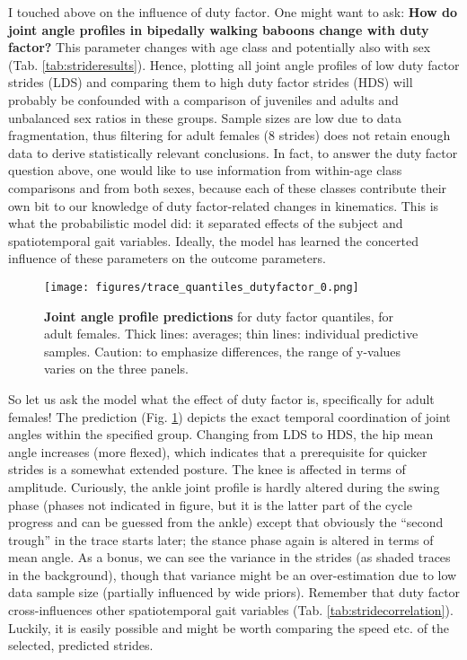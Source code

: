 I touched above on the influence of duty factor.
One might want to ask:
\textbf{How do joint angle profiles in bipedally walking baboons change with duty factor?}
This parameter changes with age class and potentially also with sex (Tab. \ref{tab:strideresults}).
Hence, plotting all joint angle profiles of low duty factor strides (LDS) and comparing them to high duty factor strides (HDS) will probably be confounded with a comparison of juveniles and adults and unbalanced sex ratios in these groups.
Sample sizes are low due to data fragmentation, thus filtering for adult females (8 strides) does not retain enough data to derive statistically relevant conclusions.
In fact, to answer the duty factor question above, one would like to use information from within-age class comparisons and from both sexes, because each of these classes contribute their own bit to our knowledge of duty factor-related changes in kinematics.
This is what the probabilistic model did: it separated effects of the subject and spatiotemporal gait variables.
Ideally, the model has learned the concerted influence of these parameters on the outcome parameters.


\begin{figure}[p]
\centering
\texttt{[image: figures/trace\_quantiles\_dutyfactor\_0.png]}
\caption{\label{fig:dutyquantileprediction}\textbf{Joint angle profile predictions} for duty factor quantiles, for adult females. Thick lines: averages; thin lines: individual predictive samples. Caution: to emphasize differences, the range of y-values varies on the three panels.}
\end{figure}

So let us ask the model what the effect of duty factor is, specifically for adult females!
The prediction (Fig. \ref{fig:dutyquantileprediction}) depicts the exact temporal coordination of joint angles within the specified group.
Changing from LDS to HDS, the hip mean angle increases (more flexed), which indicates that a prerequisite for quicker strides is a somewhat extended posture.
The knee is affected in terms of amplitude.
Curiously, the ankle joint profile is hardly altered during the swing phase (phases not indicated in figure, but it is the latter part of the cycle progress and can be guessed from the ankle) except that obviously the ``second trough'' in the trace starts later; the stance phase again is altered in terms of mean  angle.
As a bonus, we can see the variance in the strides (as shaded traces in the background), though that variance might be an over-estimation due to low data sample size (partially influenced by wide priors).
Remember that duty factor cross-influences other spatiotemporal gait variables (Tab. \ref{tab:stridecorrelation}).
Luckily, it is easily possible and might be worth comparing the speed etc. of the selected, predicted strides.



